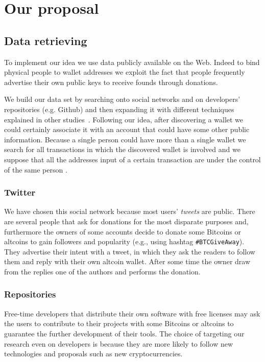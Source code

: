 \section{Our proposal}
\label{proposal}

\subsection{Data retrieving}
To implement our idea we use data publicly available on the Web. Indeed
to bind physical people to wallet addresses we exploit the fact that
people frequently advertise their own public keys to receive founds
through donations.

We build our data set by searching onto social networks and on developers'
repositories (e.g. Github) and then expanding it with different techniques
explained in other studies~\cite{bib:fistful}. Following our idea, after
discovering a wallet we could certainly associate it with an account that could
have some other public information. Because a single person could have more
than a single wallet we search for all transactions in which the
discovered wallet is involved
and we suppose that all the addresses input of a certain transaction are under
the control of the same person \cite{bib:satoshi, bib:deanon, bib:fistful}.

\subsubsection*{Twitter}
We have chosen this social network because most users' \textit{tweets} are
public. There are several people that ask for donations for the most disparate
purposes and, furthermore the owners of some accounts decide to donate some
Bitcoins or altcoins to gain followers and popularity (e.g., using hashtag
\texttt{\#BTCGiveAway}). They advertise their intent with a tweet, in which
they ask the readers to follow them and reply with their own altcoin wallet.
After some time the owner draw from the replies one of the authors and performs
the donation.

\subsubsection*{Repositories}
Free-time developers that distribute their own software with free licenses may
ask the users to contribute to their projects with some Bitcoins or altcoins to
guarantee the further development of their tools. The choice of targeting our
research even on developers is because they are more likely to follow new
technologies and proposals such as new cryptocurrencies.

